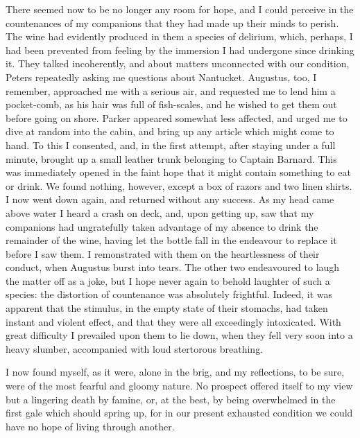 There seemed now to be no longer any room for hope, and I could perceive in
the countenances of my companions that they had made up their minds to perish.
The wine had evidently produced in them a species of delirium, which, perhaps, I
had been prevented from feeling by the immersion I had undergone since drinking
it. They talked incoherently, and about matters unconnected with our condition,
Peters repeatedly asking me questions about Nantucket. Augustus, too, I
remember, approached me with a serious air, and requested me to lend him a
pocket-comb, as his hair was full of fish-scales, and he wished to get them out
before going on shore. Parker appeared somewhat less affected, and urged me to
dive at random into the cabin, and bring up any article which might come to
hand. To this I consented, and, in the first attempt, after staying under a full
minute, brought up a small leather trunk belonging to Captain Barnard. This was
immediately opened in the faint hope that it might contain something to eat or
drink. We found nothing, however, except a box of razors and two linen shirts. I
now went down again, and returned without any success. As my head came above
water I heard a crash on deck, and, upon getting up, saw that my companions had
ungratefully taken advantage of my absence to drink the remainder of the wine,
having let the bottle fall in the endeavour to replace it before I saw them. I
remonstrated with them on the heartlessness of their conduct, when Augustus
burst into tears. The other two endeavoured to laugh the matter off as a joke,
but I hope never again to behold laughter of such a species: the distortion of
countenance was absolutely frightful. Indeed, it was apparent that the stimulus,
in the empty state of their stomachs, had taken instant and violent effect, and
that they were all exceedingly intoxicated. With great difficulty I prevailed
upon them to lie down, when they fell very soon into a heavy slumber,
accompanied with loud stertorous breathing. 

I now found myself, as it were, alone in the brig, and my reflections, to be
sure, were of the most fearful and gloomy nature. No prospect offered itself to
my view but a lingering death by famine, or, at the best, by being overwhelmed
in the first gale which should spring up, for in our present exhausted condition
we could have no hope of living through another. 

